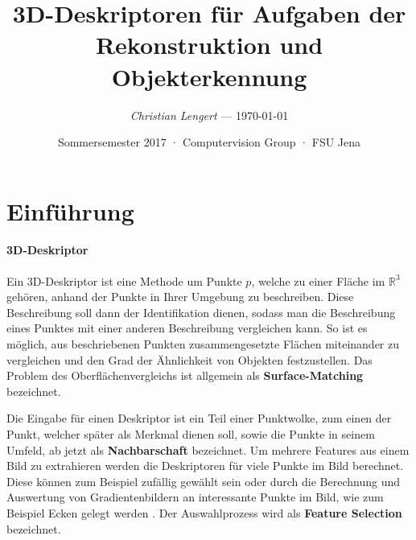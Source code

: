 \documentclass[12pt]{article}
\newcommand\svthema{3D-Deskriptoren für Aufgaben der Rekonstruktion und Objekterkennung}
\newcommand\svperson{Christian Lengert}
\newcommand\svdatum{\today}
\newcommand\lvtyp{Sommersemester 2017}
\newcommand\lvinst{Computervision Group · FSU Jena}
\begin{document}
\title{ \textbf{\color{black}\svthema} }
\author{ \textsl{\color{red}\svperson} --- \svdatum }
\date{ \small  {\lvtyp} · {\lvinst} }
\maketitle


\section{Einführung}\label{intro}
\paragraph{3D-Deskriptor}
Ein 3D-Deskriptor ist eine Methode um Punkte $p$, welche zu einer Fläche im $\mathbb{R}^3$ gehören, anhand der Punkte in Ihrer Umgebung zu beschreiben. Diese Beschreibung soll dann der Identifikation dienen, sodass man die Beschreibung eines Punktes mit einer anderen Beschreibung vergleichen kann. So ist es möglich, aus beschriebenen Punkten zusammengesetzte Flächen miteinander zu vergleichen und den Grad der Ähnlichkeit von Objekten festzustellen. Das Problem des Oberflächenvergleichs ist allgemein als \textbf{Surface-Matching} bezeichnet. 

Die Eingabe für einen Deskriptor ist ein Teil einer Punktwolke, zum einen der Punkt, welcher später als Merkmal dienen soll, sowie die Punkte in seinem Umfeld, ab jetzt als \textbf{Nachbarschaft} bezeichnet.
Um mehrere Features aus einem Bild zu extrahieren werden die Deskriptoren für viele Punkte im Bild berechnet. Diese können zum Beispiel zufällig gewählt sein \cite{SD} oder durch die Berechnung und Auswertung von Gradientenbildern an interessante Punkte im Bild, wie zum Beispiel Ecken gelegt werden \cite{harris}. Der Auswahlprozess wird als \textbf{Feature Selection} bezeichnet. 
\end{document}
